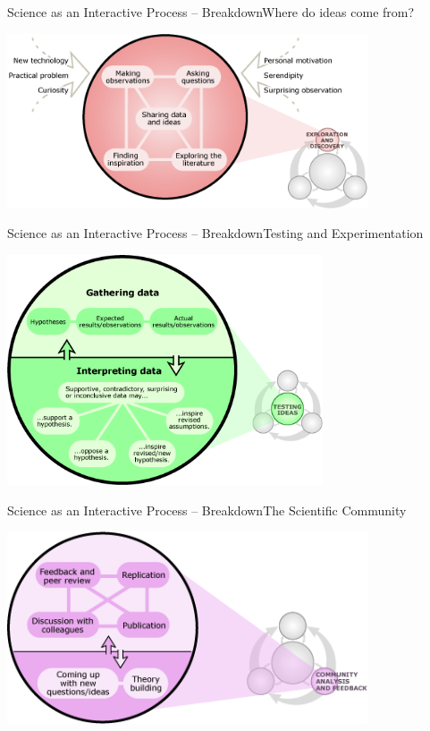 \begin{frame}{Science as an Interactive Process -- Breakdown}{Where do ideas come from?}
  \begin{center}
    \includegraphics[width=0.8\textwidth]{../img/understandingscience_zoom1}
  \end{center}
\end{frame}

\begin{frame}{Science as an Interactive Process -- Breakdown}{Testing and Experimentation}
  \begin{center}
    \includegraphics[width=0.7\textwidth]{../img/understandingscience_zoom2}
  \end{center}
\end{frame}

\begin{frame}{Science as an Interactive Process -- Breakdown}{The Scientific Community}
  \begin{center}
    \includegraphics[width=0.8\textwidth]{../img/understandingscience_zoom3}
  \end{center}
\end{frame}

